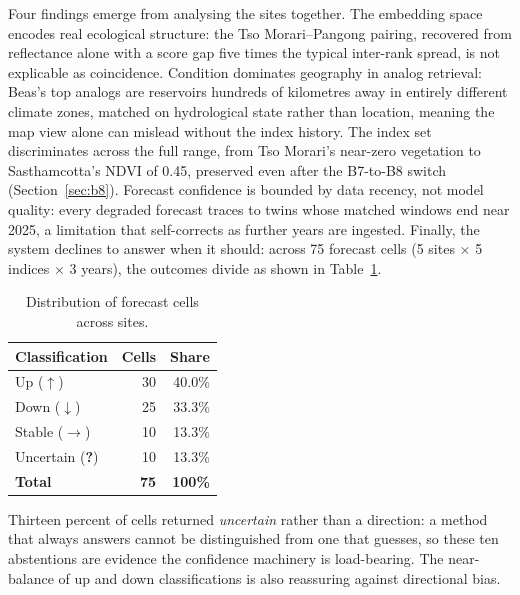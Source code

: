 \documentclass[12pt,a4paper,oneside]{report}
\begin{document}
Four findings emerge from analysing the sites together. The
embedding space encodes real ecological structure: the Tso
Morari--Pangong pairing, recovered from reflectance alone with a
score gap five times the typical inter-rank spread, is not
explicable as coincidence. Condition dominates geography in analog
retrieval: Beas's top analogs are reservoirs hundreds of kilometres
away in entirely different climate zones, matched on hydrological
state rather than location, meaning the map view alone can mislead
without the index history. The index set discriminates across the
full range, from Tso Morari's near-zero vegetation to Sasthamcotta's
NDVI of 0.45, preserved even after the B7-to-B8 switch
(Section~\ref{sec:b8}). Forecast confidence is bounded by data
recency, not model quality: every degraded forecast traces to twins
whose matched windows end near 2025, a limitation that self-corrects
as further years are ingested. Finally, the system declines to
answer when it should: across 75 forecast cells (5 sites $\times$ 5
indices $\times$ 3 years), the outcomes divide as shown in
Table~\ref{tab:direction_dist}.

\begin{table}[H]
\centering
\caption{Distribution of forecast cells across sites.}
\label{tab:direction_dist}
\begin{tabular}{lrr}
\toprule
Classification & Cells & Share \\
\midrule
Up ($\uparrow$)          & 30 & 40.0\% \\
Down ($\downarrow$)      & 25 & 33.3\% \\
Stable ($\rightarrow$)   & 10 & 13.3\% \\
Uncertain (\textbf{?})   & 10 & 13.3\% \\
\midrule
\textbf{Total}           & \textbf{75} & \textbf{100\%} \\
\bottomrule
\end{tabular}
\end{table}

Thirteen percent of cells returned \emph{uncertain} rather than a
direction: a method that always answers cannot be distinguished from
one that guesses, so these ten abstentions are evidence the
confidence machinery is load-bearing. The near-balance of up and
down classifications is also reassuring against directional bias.

\end{document}
